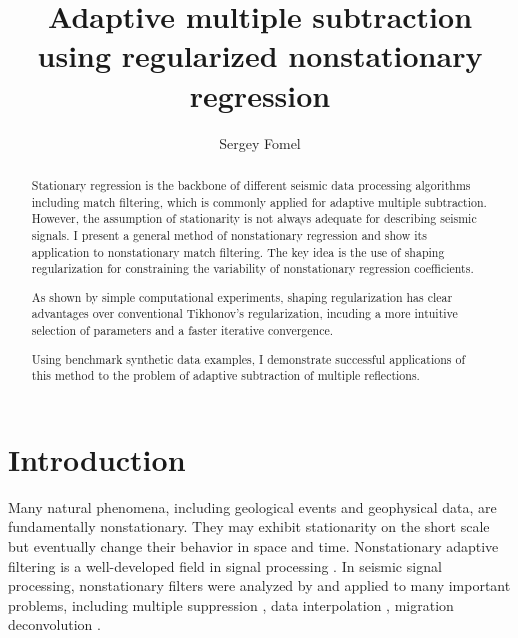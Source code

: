 \title{Adaptive multiple subtraction using regularized nonstationary regression}

\author{Sergey Fomel}


\address{Bureau of Economic Geology \\
John A. and Katherine G. Jackson School of Geosciences \\
The University of Texas at Austin \\
University Station, Box X \\
Austin, TX 78713-8924}


\maketitle

\begin{abstract}
  Stationary regression is the backbone of different seismic data
  processing algorithms including match filtering, which is commonly
  applied for adaptive multiple subtraction. However, the assumption
  of stationarity is not always adequate for describing seismic
  signals. I present a general method of nonstationary regression and
  show its application to nonstationary match filtering. The key idea
  is the use of shaping regularization for constraining the
  variability of nonstationary regression coefficients. 

As shown by simple computational experiments, shaping regularization
has clear advantages over conventional Tikhonov's regularization,
incuding a more intuitive selection of parameters and a faster
iterative convergence.

Using benchmark synthetic data examples, I demonstrate successful
  applications of this method to the problem of adaptive subtraction
  of multiple reflections.
\end{abstract}

\section{Introduction}
Many natural phenomena, including geological events and geophysical
data, are fundamentally nonstationary. They may exhibit stationarity
on the short scale but eventually change their behavior in space and
time. Nonstationary adaptive filtering is a well-developed field in
signal processing \cite[]{haykin}. In seismic signal processing,
nonstationary filters were analyzed by \cite{GEO63-01-02440259} and
applied to many important problems, including multiple suppression
\cite[]{EAE-2001-P167}, data interpolation
\cite[]{SEG-1999-11541157,SEG-2003-19131916}, migration deconvolution
\cite[]{GEO69-04-10171024,alejandro}.

